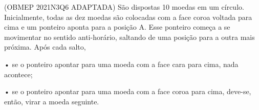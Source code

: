 \documentclass[preview]{standalone}
\begin{document}
\begin{center}
(OBMEP 2021N3Q6 ADAPTADA) São dispostas 10 moedas em um círculo.
Inicialmente, todas as dez moedas são colocadas com a face coroa voltada para cima e um
ponteiro aponta para a posição A. Esse ponteiro começa a se movimentar no sentido anti-horário,
saltando de uma posição para a outra mais próxima. 
Após cada salto,

 • se o ponteiro apontar para uma moeda
com a face cara para cima, nada acontece;

 • se o ponteiro apontar para uma moeda
com a face coroa para cima, deve-se, então,
virar a moeda seguinte.
\end{center}
\end{document}
